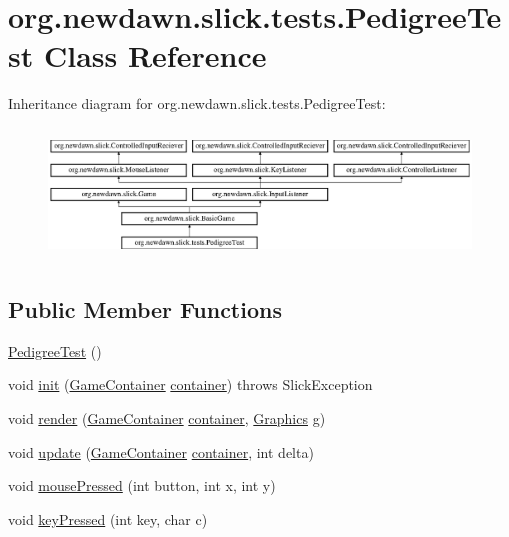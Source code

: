 \hypertarget{classorg_1_1newdawn_1_1slick_1_1tests_1_1_pedigree_test}{}\section{org.\+newdawn.\+slick.\+tests.\+Pedigree\+Test Class Reference}
\label{classorg_1_1newdawn_1_1slick_1_1tests_1_1_pedigree_test}
Inheritance diagram for org.\+newdawn.\+slick.\+tests.\+Pedigree\+Test\+:\begin{figure}[H]
\begin{center}
\leavevmode
\includegraphics[height=3.522012cm]{classorg_1_1newdawn_1_1slick_1_1tests_1_1_pedigree_test}
\end{center}
\end{figure}
\subsection*{Public Member Functions}
\begin{DoxyCompactItemize}
\item 
\mbox{\hyperlink{classorg_1_1newdawn_1_1slick_1_1tests_1_1_pedigree_test_a8949eb52257a1eb1373ab71026d4afbb}{Pedigree\+Test}} ()
\item 
void \mbox{\hyperlink{classorg_1_1newdawn_1_1slick_1_1tests_1_1_pedigree_test_a22299e5af6bb0adea73370ede9922c13}{init}} (\mbox{\hyperlink{classorg_1_1newdawn_1_1slick_1_1_game_container}{Game\+Container}} \mbox{\hyperlink{classorg_1_1newdawn_1_1slick_1_1tests_1_1_pedigree_test_a803d53a8e6fe77152a4710313def6132}{container}})  throws Slick\+Exception 
\item 
void \mbox{\hyperlink{classorg_1_1newdawn_1_1slick_1_1tests_1_1_pedigree_test_a8b1fd76eb8e541e612450649ececfebd}{render}} (\mbox{\hyperlink{classorg_1_1newdawn_1_1slick_1_1_game_container}{Game\+Container}} \mbox{\hyperlink{classorg_1_1newdawn_1_1slick_1_1tests_1_1_pedigree_test_a803d53a8e6fe77152a4710313def6132}{container}}, \mbox{\hyperlink{classorg_1_1newdawn_1_1slick_1_1_graphics}{Graphics}} g)
\item 
void \mbox{\hyperlink{classorg_1_1newdawn_1_1slick_1_1tests_1_1_pedigree_test_abde3a1e882925acbcfa34f83c8070110}{update}} (\mbox{\hyperlink{classorg_1_1newdawn_1_1slick_1_1_game_container}{Game\+Container}} \mbox{\hyperlink{classorg_1_1newdawn_1_1slick_1_1tests_1_1_pedigree_test_a803d53a8e6fe77152a4710313def6132}{container}}, int delta)
\item 
void \mbox{\hyperlink{classorg_1_1newdawn_1_1slick_1_1tests_1_1_pedigree_test_ae226b491b433eaac6408b764b7e0c9a5}{mouse\+Pressed}} (int button, int x, int y)
\item 
void \mbox{\hyperlink{classorg_1_1newdawn_1_1slick_1_1tests_1_1_pedigree_test_ab5e99c7998057eb96d5cc510a442953e}{key\+Pressed}} (int key, char c)
\end{DoxyCompactItemize}
